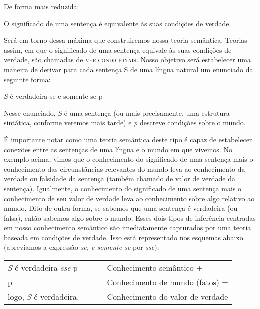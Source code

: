 \n De forma mais reduzida:

\begin{exe}
	\ex O significado de uma sentença é equivalente às suas condi\-çõ\-es de verdade.
\end{exe}


\n Será em torno dessa máxima que construiremos nossa teoria
semântica. Teorias assim, em que o significado de uma sentença equivale às suas condições de verdade, são chamadas de \textsc{vericondicionais}. Nosso objetivo será estabelecer uma maneira de derivar
para cada sentença S de uma língua natural um enunciado da
seguinte forma:

\begin{exe}
	\ex \textit{S} é verdadeira se e somente se p
\end{exe}

\noindent Nesse enunciado,  \textit{S} é uma sentença (ou mais
pre\-ci\-sa\-men\-te, uma estrutura sin\-tá\-ti\-ca, conforme
veremos mais tarde) e \textit{p} descreve condi\-çõ\-es sobre o
mundo.

É importante notar como uma teoria semântica deste tipo é capaz de
estabelecer conexões entre as sen\-ten\-ças de uma língua e o
mundo em que vivemos. No exemplo acima, vimos que o conhecimento
do significado de uma sentença mais o conhecimento das
circunstâncias relevantes do mundo leva ao conhecimento da verdade
ou falsidade da sentença (também chamado de valor de verdade da
sentença). Igualmente, o conhecimento do significado de uma
sentença mais o conhecimento de seu valor de verdade leva ao
conhecimento sobre algo relativo ao mundo. Dito de outra forma, se
sabemos que uma sentença é verdadeira (ou falsa), então sabemos
algo sobre o mundo. Esses dois tipos de inferência centradas em
nosso conhecimento semântico são imediatamente capturados por uma
teoria baseada em condi\-çõ\-es de verdade. Isso está representado
nos esquemas abaixo (abreviamos a expressão \textit{se, e somente
se} por \textit{sse}):

\begin{exe}
	\ex \begin{tabular}[t]{l l l}
		
		\textit{S} é verdadeira \textit{sse} p & \ \ \  & Conhecimento semântico + \\
		
		p & \ \ \  & Conhecimento de mundo (fatos) = \\
		logo, \textit{S} é verdadeira. & \ \ \  & Conhecimento do valor de verdade \\
		
	\end{tabular}
\end{exe}


